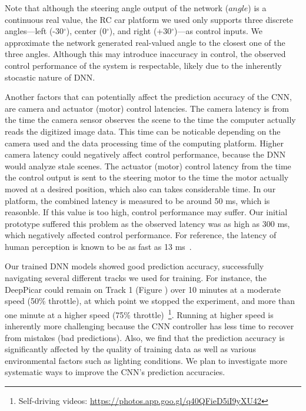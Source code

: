 Note that although the steering angle output of the network ($angle$) is
a continuous real value, the RC car platform we used only supports
three discrete angles---left (-30$^{\circ}$), center 
(0$^{\circ}$), and right (+30$^{\circ}$)---as control inputs.
We approximate the network generated real-valued angle to the closest
one of the three angles. Although this may introduce inaccuracy in
control, the observed control performance of the system is respectable,
likely due to the inherently stocastic nature of DNN.


Another factors that can potentially affect the prediction accuracy of
the CNN, are camera and actuator (motor) control latencies. The camera
latency is from the time the camera sensor observes the scene to the
time the computer actually reads the digitized image data. This time
can be noticable depending on the camera used and the data processing
time of the computing platform. Higher camera latency could
negatively affect control performance, because the DNN would analyze
stale scenes. The actuator (motor) control latency from the time
the control output is sent to the steering motor to the time the motor
actually moved at a desired position, which also can takes
considerable time. In our platform, the combined latency is measured
to be around 50 ms, which is reasonble.
If this value is too high, control performance may suffer.
Our initial prototype suffered this problem as the observed latency
was as high as 300 ms, which negatively affected control performance.
For reference, the latency of human perception is known to be as fast
as 13 ms~\cite{ThomasBurger2015}. 

Our trained DNN models showed good prediction accuracy, successfully
navigating several different tracks we used for training.
For instance, the DeepPicar could remain on Track 1
(Figure \label{fig:track}) over 10 minutes at a moderate speed (50\%
throttle), at which point we stopped the experiment, and more than one
minute at a higher speed (75\% throttle)~\footnote{Self-driving videos: \url{https://photos.app.goo.gl/q40QFieD5iI9yXU42}
}. Running at
higher speed is inherently more challenging because the CNN controller
has less time to recover from mistakes (bad predictions).  Also, we
find that the prediction accuracy is significantly affected by the
quality of training data as well as various environmental factors such
as lighting conditions. We plan to investigate more systematic ways
to improve the CNN's prediction accuracies.

